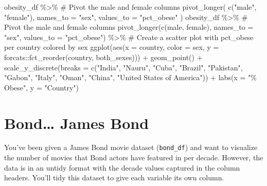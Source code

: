 \documentclass[
  letterpaper,
  DIV=11,
  numbers=noendperiod]{scrreprt}
\newenvironment{Shaded}{\begin{snugshade}}{\end{snugshade}}
\newcommand{\AttributeTok}[1]{\textcolor[rgb]{0.40,0.45,0.13}{#1}}
\newcommand{\CommentTok}[1]{\textcolor[rgb]{0.37,0.37,0.37}{#1}}
\newcommand{\FunctionTok}[1]{\textcolor[rgb]{0.28,0.35,0.67}{#1}}
\newcommand{\NormalTok}[1]{\textcolor[rgb]{0.00,0.23,0.31}{#1}}
\newcommand{\SpecialCharTok}[1]{\textcolor[rgb]{0.37,0.37,0.37}{#1}}
\newcommand{\StringTok}[1]{\textcolor[rgb]{0.13,0.47,0.30}{#1}}
\begin{document}
\begin{Shaded}
\begin{Highlighting}[]
\NormalTok{obesity\_df }\SpecialCharTok{\%\textgreater{}\%} 
  \CommentTok{\# Pivot the male and female columns}
  \FunctionTok{pivot\_longer}\NormalTok{(}
    \FunctionTok{c}\NormalTok{(}\StringTok{"male"}\NormalTok{, }\StringTok{"female"}\NormalTok{),}
    \AttributeTok{names\_to =} \StringTok{"sex"}\NormalTok{,}
    \AttributeTok{values\_to =} \StringTok{"pct\_obese"}
\NormalTok{  )}
\NormalTok{obesity\_df }\SpecialCharTok{\%\textgreater{}\%} 
  \CommentTok{\# Pivot the male and female columns}
  \FunctionTok{pivot\_longer}\NormalTok{(}\FunctionTok{c}\NormalTok{(male, female),}
               \AttributeTok{names\_to =} \StringTok{"sex"}\NormalTok{,}
               \AttributeTok{values\_to =} \StringTok{"pct\_obese"}\NormalTok{) }\SpecialCharTok{\%\textgreater{}\%} 
  \CommentTok{\# Create a scatter plot with pct\_obese per country colored by sex}
  \FunctionTok{ggplot}\NormalTok{(}\FunctionTok{aes}\NormalTok{(}\AttributeTok{x =}\NormalTok{ country, }\AttributeTok{color =}\NormalTok{ sex,}
             \AttributeTok{y =}\NormalTok{ forcats}\SpecialCharTok{::}\FunctionTok{fct\_reorder}\NormalTok{(country, both\_sexes))) }\SpecialCharTok{+}
  \FunctionTok{geom\_point}\NormalTok{() }\SpecialCharTok{+}
  \FunctionTok{scale\_y\_discrete}\NormalTok{(}\AttributeTok{breaks =} \FunctionTok{c}\NormalTok{(}\StringTok{"India"}\NormalTok{, }\StringTok{"Nauru"}\NormalTok{, }\StringTok{"Cuba"}\NormalTok{, }\StringTok{"Brazil"}\NormalTok{,}
                              \StringTok{"Pakistan"}\NormalTok{, }\StringTok{"Gabon"}\NormalTok{, }\StringTok{"Italy"}\NormalTok{, }\StringTok{"Oman"}\NormalTok{,}
                              \StringTok{"China"}\NormalTok{, }\StringTok{"United States of America"}\NormalTok{)) }\SpecialCharTok{+}
  \FunctionTok{labs}\NormalTok{(}\AttributeTok{x =} \StringTok{"\% Obese"}\NormalTok{, }\AttributeTok{y =} \StringTok{"Country"}\NormalTok{)}
\end{Highlighting}
\end{Shaded}

\hypertarget{bond-james-bond}{%
\section{Bond\ldots{} James Bond}\label{bond-james-bond}}

You've been given a James Bond movie dataset (\texttt{bond\_df}) and
want to visualize the number of movies that Bond actors have featured in
per decade. However, the data is in an untidy format with the decade
values captured in the column headers. You'll tidy this dataset to give
each variable its own column.
\end{document}
